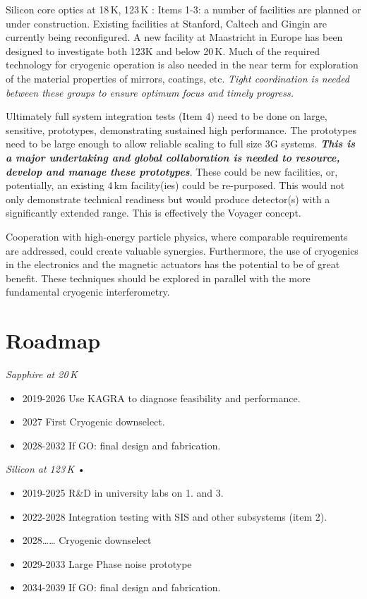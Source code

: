 Silicon core optics at 18\,K, 123\,K : Items 1-3:  a number of facilities are planned or under construction.  Existing facilities  at Stanford, Caltech and Gingin are currently being reconfigured. A  new facility at Maastricht in Europe has been designed to investigate  both 123K and  below 20\,K. Much of the required technology for cryogenic operation is also needed in the near term for  exploration of  the material properties of mirrors, coatings, etc.  \textit{Tight coordination is needed between these groups to  ensure optimum focus and timely progress.}

Ultimately full system integration tests (Item 4) need to be done on large, sensitive, prototypes, demonstrating sustained high performance.  The prototypes need to be large enough to allow reliable scaling to full size 3G systems.  \textit{\textbf{This is a major undertaking and global collaboration is needed to resource, develop and manage these prototypes}}.  These could be new facilities, or,  potentially, an existing 4\,km facility(ies) could be re-purposed.  This would not only demonstrate technical readiness but would produce detector(s) with a significantly extended range.  This is effectively the Voyager concept.

Cooperation with high-energy particle physics, where comparable requirements are addressed, could create valuable synergies. Furthermore, the use of cryogenics in the electronics and the magnetic actuators\cite{cryo:OSEM} has the potential to be of great benefit. These techniques should be explored in parallel with the more fundamental cryogenic interferometry.

\section{Roadmap}

\textit{Sapphire at 20\,K}


\begin{itemize}
\item  2019-2026  	Use KAGRA to diagnose  feasibility and performance.
\item  2027  		First Cryogenic downselect.  
\item  2028-2032  		If GO:  final design and fabrication.
\end{itemize}



\textit{Silicon at 	123\,K}
•  \begin{itemize}
\item 2019-2025  	R\&D in university labs on 1. and 3.
\item 2022-2028	Integration testing with SIS and other subsystems  (item 2).
\item 2028……  	Cryogenic downselect
\item 2029-2033	Large  Phase noise prototype
\item 2034-2039		If GO:  final design and fabrication.
\end{itemize}



